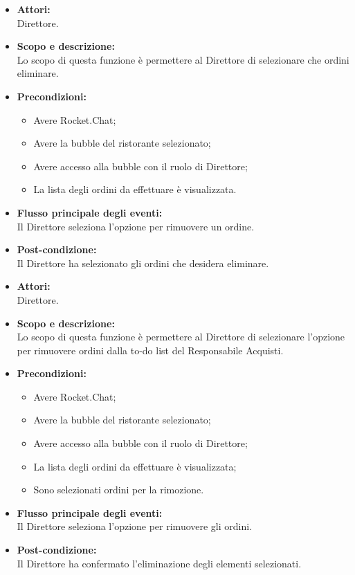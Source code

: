 
\begin{itemize}
	\item \textbf{Attori:}
	\\Direttore.
	\item \textbf{Scopo e descrizione:} 
	\\Lo scopo di questa funzione è permettere al Direttore di selezionare che ordini eliminare.
	\item \textbf{Precondizioni:}
	\begin{itemize}
		\item Avere Rocket.Chat;
		\item Avere la bubble del ristorante selezionato;
		\item Avere accesso alla bubble con il ruolo di Direttore;
		\item La lista degli ordini da effettuare è visualizzata.
	\end{itemize}
	\item \textbf{Flusso principale degli eventi:}
	\\Il Direttore seleziona l'opzione per rimuovere un ordine.
	\item \textbf{Post-condizione:}
	\\Il Direttore ha selezionato gli ordini che desidera eliminare.
\end{itemize}


\begin{itemize}
	\item \textbf{Attori:}
	\\Direttore.
	\item \textbf{Scopo e descrizione:} 
	\\Lo scopo di questa funzione è permettere al Direttore di selezionare l'opzione per rimuovere ordini dalla to-do list del Responsabile Acquisti.
	\item \textbf{Precondizioni:}
	\begin{itemize}
		\item Avere Rocket.Chat;
		\item Avere la bubble del ristorante selezionato;
		\item Avere accesso alla bubble con il ruolo di Direttore;
		\item La lista degli ordini da effettuare è visualizzata;
		\item Sono selezionati ordini per la rimozione.
	\end{itemize}
	\item \textbf{Flusso principale degli eventi:}
	\\Il Direttore seleziona l'opzione per rimuovere gli ordini.
	\item \textbf{Post-condizione:}
	\\Il Direttore ha confermato l'eliminazione degli elementi selezionati.
\end{itemize}

